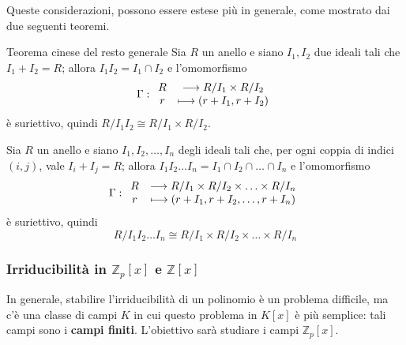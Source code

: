 \documentclass[11pt, a4paper]{scrartcl}
\theoremstyle{definition}
\numberwithin{esempio}{section}
\theoremstyle{definition}
\numberwithin{obs}{section}
\numberwithin{nota}{section}
\numberwithin{equation}{subsection}
\begin{document}
Queste considerazioni, possono essere estese pi\`u in generale, come mostrato dai due seguenti teoremi.
\begin{teorema}
	{Teorema cinese del resto generale}{}
	Sia $R$ un anello e siano $I_1,I_2$ due ideali tali che $I_1 + I_2 = R$; allora $I_1I_2 = I_1 \cap I_2$ e l'omomorfismo 
	\[
\Gamma :
\begin{array}{c c c}
	R & \longrightarrow R / I_1 \times  R / I_2\\
	r & \longmapsto \left(r + I_1 , r + I_2\right) 
\end{array}
	\] 
	\`e suriettivo, quindi $R / I_1I_2 \cong R / I_1 \times  R / I_2$.
\end{teorema}
\begin{teorema}
	{}{}
	Sia $R$ un anello e siano $I_1,I_2, \ldots, I_n$ degli ideali tali che, per ogni coppia di indici $(i,j)$, vale $I_i + I_j = R$; allora $I_1I_2\ldots I_n = I_1\cap I_2\cap \ldots\cap I_n$ e l'omomorfismo 
	\[
\Gamma :
\begin{array}{c c c}
	R & \longrightarrow R / I_1 \times  R / I_2 \times  \ldots \times R / I_n\\
	r & \longmapsto \left(r + I_1 , r + I_2,\ldots, r + I_n\right) 
\end{array}
	\] 
	\`e suriettivo, quindi 
	\[
	R / I_1 I_2 \ldots I_n \cong R / I_1 \times  R / I_2 \times \ldots \times  R / I_n
	\] 
\end{teorema}
\subsubsection{Irriducibilit\`a in $\mathbb{Z}_p[x]$ e $\mathbb{Z}[x]$}
In generale, stabilire l'irriducibilit\`a di un polinomio \`e un problema difficile, ma c'\`e una classe di campi $K$ in cui questo problema in $K[x]$ \`e pi\`u semplice: tali campi sono i \textbf{campi finiti}. L'obiettivo sar\`a studiare i campi $\mathbb{Z}_p [x]$.
\end{document}

